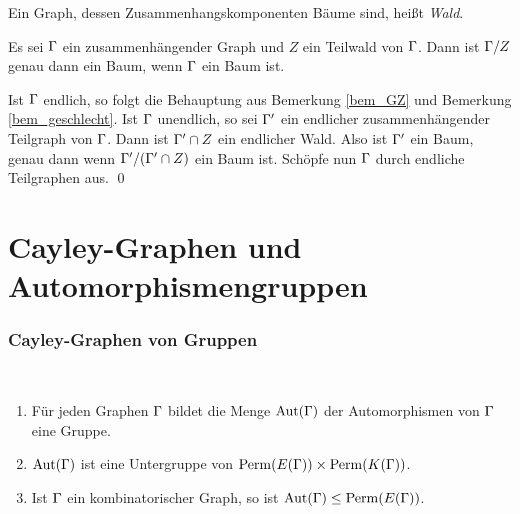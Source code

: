 \documentclass[a4paper, 12pt, twoside]{article}
\begin{document}
\DEF Ein Graph, dessen Zusammenhangskomponenten Bäume sind,
heißt \emph{Wald}.

\PROP\label{prop_wald}
Es sei $\Gamma$ ein zusammenhängender Graph und $Z$ ein Teilwald
von $\Gamma$. Dann ist $\Gamma/Z$ genau dann ein Baum, wenn $\Gamma$ ein
Baum ist.

\bew Ist $\Gamma$ endlich, so folgt die Behauptung aus Bemerkung
\ref{bem_GZ} und Bemerkung \ref{bem_geschlecht}.
Ist $\Gamma$ unendlich, so sei $\Gamma'$ ein endlicher zusammenhängender
Teilgraph von $\Gamma$. Dann ist $\Gamma'\cap Z$ ein endlicher Wald.
Also ist $\Gamma'$ ein Baum, genau dann wenn $\Gamma'/(\Gamma'\cap Z)$ ein Baum
ist. Schöpfe nun $\Gamma$ durch endliche Teilgraphen aus.
\qed


\cleardoublepage
\part{Cayley-Graphen und Automorphismengruppen}

\section{Cayley-Graphen von Gruppen}\label{sec_cayley}

\BEM\
\begin{enumerate}
\item Für jeden Graphen $\Gamma$ bildet die Menge $\Aut(\GR)$ der
Automorphismen von $\Gamma$ eine Gruppe.\index{$\Aut(\GR)$}
\item $\Aut(\GR)$ ist eine Untergruppe von
$\mathrm{Perm}(E(\Gamma)) \times \mathrm{Perm}(K(\Gamma))$.
\item Ist $\Gamma$ ein kombinatorischer Graph, so ist
$\mathrm{Aut}(\Gamma)\leq \mathrm{Perm}(E(\Gamma))$.
\end{enumerate}
\end{document}
